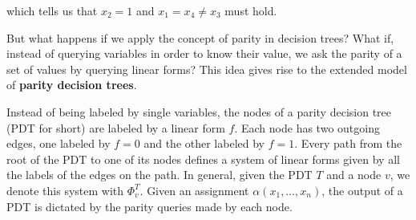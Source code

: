 which tells us that $x_2 = 1$ and $x_1 = x_4 \neq x_3$ must hold.

\newpage

But what happens if we apply the concept of parity in decision trees? What if, instead of querying variables in order to know their value, we ask the parity of a set of values by querying linear forms? This idea gives rise to the extended model of \textbf{parity decision trees}.

Instead of being labeled by single variables, the nodes of a parity decision tree (PDT for short) are labeled by a linear form $f$. Each node has two outgoing edges, one labeled by $f = 0$ and the other labeled by $f = 1$. Every path from the root of the PDT to one of its nodes defines a system of linear forms given by all the labels of the edges on the path. In general, given the PDT $T$ and a node $v$, we denote this system with $\Phi_v^T$. Given an assignment $\alpha(x_1, \ldots, x_n)$, the output of a PDT is dictated by the parity queries made by each node.


